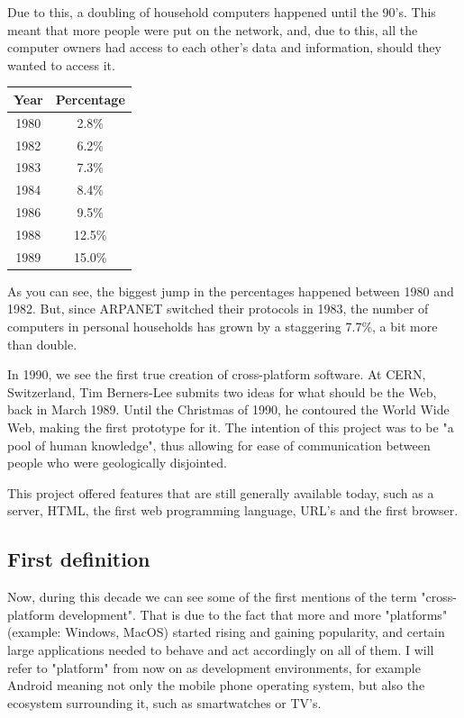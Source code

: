 \par
Due to this, a doubling of household computers happened until the 90's.
This meant that more people were put on the network, and, due to this, all the computer owners had access to each other's data and information, should they wanted to access it.
\begin{center}
    \begin{tabular}{|| c | c ||}
          \hline
          \textbf{Year} & \textbf{Percentage} \\
          \hline
          1980 & 2.8\% \\
          \hline
          1982 & 6.2\% \\
          \hline
          1983 & 7.3\% \\
          \hline
          1984 & 8.4\% \\
          \hline
          1986 & 9.5\% \\
          \hline
          1988 & 12.5\% \\
          \hline
          1989 & 15.0\% \\
          \hline
    \end{tabular}
\end{center}

\par
As you can see, the biggest jump in the percentages happened between 1980 and 1982.
But, since ARPANET switched their protocols in 1983, the number of computers in personal households has grown by a staggering 7.7\%, a bit more than double.
\par
In 1990, we see the first true creation of cross-platform software.
At CERN, Switzerland, Tim Berners-Lee submits two ideas for what should be the Web, back in March 1989.
Until the Christmas of 1990, he contoured the World Wide Web, making the first prototype for it.
The intention of this project was to be "a pool of human knowledge", thus allowing for ease of communication between people who were geologically disjointed\cite{worldWideWeb}.

\par
This project offered features that are still generally available today, such as a server, HTML, the first web programming language, URL's and the first browser.

\subsection{First definition}
Now, during this decade we can see some of the first mentions of the term "cross-platform development".
That is due to the fact that more and more "platforms" (example: Windows, MacOS) started rising and gaining popularity, and certain large applications needed to behave and act accordingly on all of them.
I will refer to "platform" from now on as development environments, for example Android meaning not only the mobile phone operating system, but also the ecosystem surrounding it, such as smartwatches or TV's.


